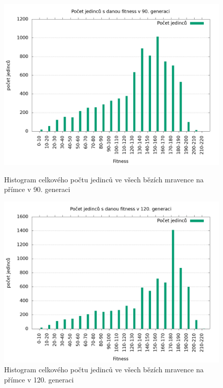 \begin{figure}[h]
    \begin{minipage}[c]{0.48\linewidth}
        \includegraphics[width=\linewidth]{obrazky/mravenec_primka_fitnessHistogram90.png}
        \caption{Histogram celkového počtu jedinců ve všech bězích mravence na přímce v 90. generaci}
        \label{fig:mravenec_primka_histogram_90}
    \end{minipage}
    \hfill
    \begin{minipage}[c]{0.48\linewidth}
        \includegraphics[width=\linewidth]{obrazky/mravenec_primka_fitnessHistogram120.png}
        \caption{Histogram celkového počtu jedinců ve všech bězích mravence na přímce v 120. generaci}
        \label{fig:mravenec_primka_histogram_120}
    \end{minipage}
\end{figure}

